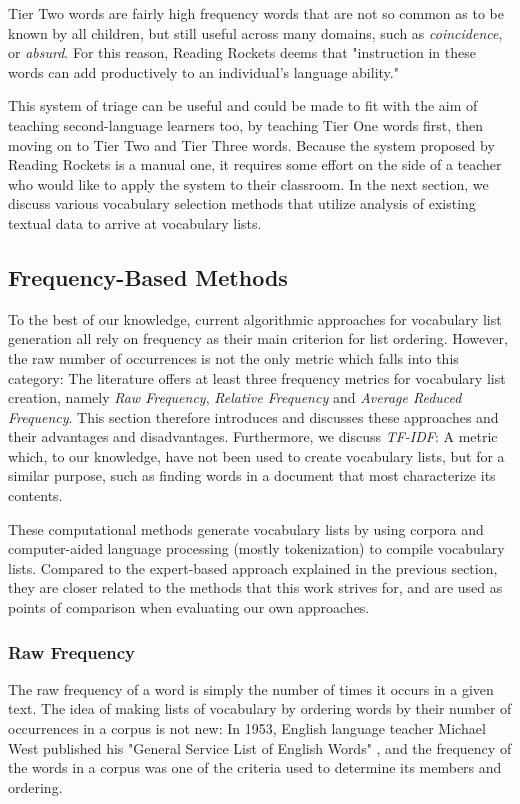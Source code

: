 Tier Two words are fairly high frequency words that are not so common as to be known by all children, but still useful across many domains, such as \textit{coincidence}, or \textit{absurd}.
For this reason, Reading Rockets deems that "instruction in these words can add productively to an individual’s language ability." 

This system of triage can be useful and could be made to fit with the aim of teaching second-language learners too, by teaching Tier One words first, then moving on to Tier Two and Tier Three words.
Because the system proposed by Reading Rockets is a manual one, it requires some effort on the side of a teacher who would like to apply the system to their classroom.
In the next section, we discuss various vocabulary selection methods that utilize analysis of existing textual data to arrive at vocabulary lists.

\subsection{Frequency-Based Methods} \label{sec:frequency-based-list-generation-methods}
To the best of our knowledge, current algorithmic approaches for vocabulary list generation all rely on frequency as their main criterion for list ordering.
However, the raw number of occurrences is not the only metric which falls into this category:
The literature offers at least three frequency metrics for vocabulary list creation, namely \textit{Raw Frequency}, \textit{Relative Frequency} and \textit{Average Reduced Frequency}.
This section therefore introduces and discusses these approaches and their advantages and disadvantages.
Furthermore, we discuss \textit{TF-IDF}:
A metric which, to our knowledge, have not been used to create vocabulary lists, but for a similar purpose, such as finding words in a document that most characterize its contents.

These computational methods generate vocabulary lists by using corpora and computer-aided language processing (mostly tokenization) to compile vocabulary lists.
Compared to the expert-based approach explained in the previous section, they are closer related to the methods that this work strives for, and are used as points of comparison when evaluating our own approaches.

\subsubsection {Raw Frequency}
The raw frequency of a word is simply the number of times it occurs in a given text.
The idea of making lists of vocabulary by ordering words by their number of occurrences in a corpus is not new:
In 1953, English language teacher Michael West published his "General Service List of English Words" \cite{michaelwestGeneralServiceList1953}, and the frequency of the words in a corpus was one of the criteria used to determine its members and ordering.

